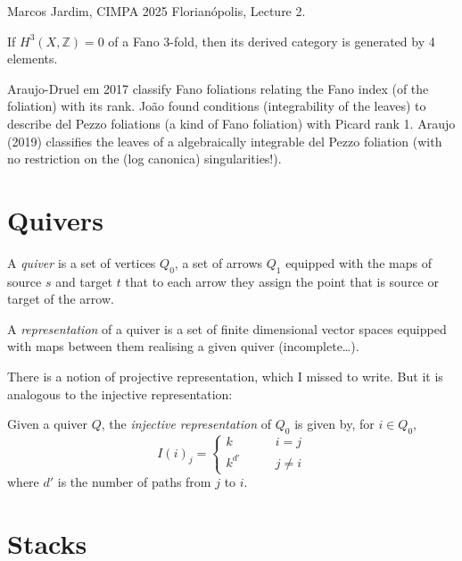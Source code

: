 \begin{remark}
\label{remark-deriv-categ-fano-3-folds}
\begin{reference}
Marcos Jardim, CIMPA 2025 Florianópolis,
Lecture 2.
\end{reference}
If $H^3(X,\mathbb{Z})=0$ of a Fano 3-fold,
then its derived category is
generated by 4 elements.
\end{remark}

\medskip\noindent
Araujo-Druel em 2017 classify
Fano foliations relating the Fano index (of
the foliation)
with its rank.
João found conditions
(integrability of the leaves)
to describe del Pezzo foliations
(a kind of Fano foliation)
with Picard rank 1.
Araujo (2019) classifies the leaves of a
algebraically integrable
del Pezzo foliation (with no restriction on
the (log
canonica) singularities!).


\section{Quivers}
\label{section-quivers}

\begin{definition}
\label{definition-quiver}
A {\it quiver} is a set of vertices $Q_0$, a
set of arrows $Q_1$ equipped with
the maps of source $s$ and target $t$ that to
each arrow they assign the point
that is source or target of the arrow.
\end{definition}

\begin{definition}
\label{definition-representation-of-quiver}
A {\it representation} of a quiver is a set
of finite dimensional vector spaces
equipped with maps between them realising a
given quiver (incomplete…).
\end{definition}

There is a notion of projective
representation, which I missed to write. But
it
is analogous to the injective representation:

\begin{definition}
\label{definition-injec-repre-quive}
Given a quiver $Q$, the {\it injective
representation} of $Q_0$ is given by, for
$i \in Q_0$,
$$
I(i)_j=\begin{cases}
k\qquad &i=j \\
k^{d'}\qquad &j \neq i
\end{cases}
$$
where $d'$ is the number of paths from $j$ to
$i$.
\end{definition}

\section{Stacks}
\label{section-stacks}

